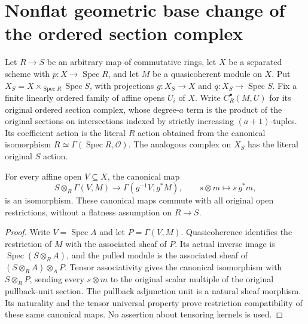 \section{Nonflat geometric base change of the ordered section complex}

Let $R\to S$ be an arbitrary map of commutative rings, let
$X$ be a separated scheme with $p:X\to\operatorname{Spec}R$, and let $M$ be a
quasicoherent module on $X$.  Put
$X_S=X\times_{\operatorname{Spec}R}\operatorname{Spec}S$, with
projections $g:X_S\to X$ and $q:X_S\to\operatorname{Spec}S$.
Fix a finite linearly ordered family of affine opens $U_i$ of $X$.
Write $C_R^\bullet(M,U)$ for its original ordered section complex,
whose degree-$a$ term is the product of the original sections on
intersections indexed by strictly increasing $(a+1)$-tuples.  Its
coefficient action is the literal $R$ action obtained from the
canonical isomorphism $R\simeq\Gamma(\operatorname{Spec}R,\mathcal O)$.
The analogous complex on $X_S$ has the literal original $S$ action.

\begin{lemma}
\label{lem:kn-geometric-cech-affine-section}
\leanok
For every affine open $V\subseteq X$, the canonical map
\[
 S\otimes_R\Gamma(V,M)\longrightarrow
 \Gamma(g^{-1}V,g^*M),\qquad s\otimes m\longmapsto s\,g^*m,
\]
is an isomorphism.  These canonical maps commute with all original
open restrictions, without a flatness assumption on $R\to S$.
\end{lemma}
\begin{proof}
Write $V=\operatorname{Spec}A$ and let $P=\Gamma(V,M)$.
Quasicoherence identifies the restriction of $M$ with the associated
sheaf of $P$.  Its actual inverse image is
$\operatorname{Spec}(S\otimes_R A)$, and the pulled module is the
associated sheaf of $(S\otimes_R A)\otimes_A P$.
Tensor associativity gives the canonical isomorphism with
$S\otimes_R P$, sending every $s\otimes m$ to the original scalar
multiple of the original pullback-unit section.  The pullback
adjunction unit is a natural sheaf morphism.  Its naturality and the
tensor universal property prove restriction compatibility of these
same canonical maps.  No assertion about tensoring kernels is used.
\end{proof}

